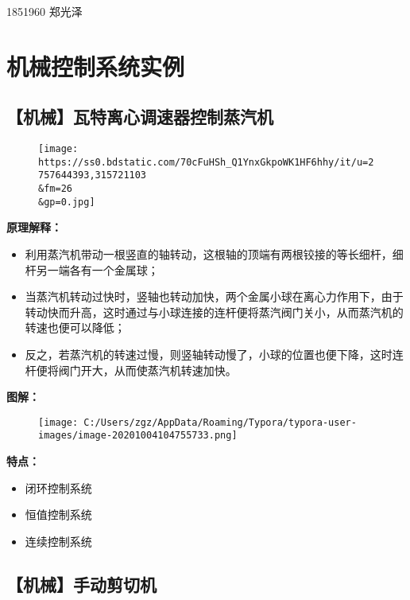 \documentclass[
]{article}
\author{}
\date{}
\begin{document}
1851960 郑光泽

\hypertarget{header-n2}{%
\section{机械控制系统实例}\label{header-n2}}

\hypertarget{header-n3}{%
\subsection{【机械】瓦特离心调速器控制蒸汽机}\label{header-n3}}

\begin{figure}
\centering
\texttt{[image: https://ss0.bdstatic.com/70cFuHSh\_Q1YnxGkpoWK1HF6hhy/it/u=2757644393,315721103\\\&fm=26\\\&gp=0.jpg]}
\caption{}
\end{figure}

\textbf{原理解释：}

\begin{itemize}
\item
  利用蒸汽机带动一根竖直的轴转动，这根轴的顶端有两根铰接的等长细杆，细杆另一端各有一个金属球；
\item
  当蒸汽机转动过快时，竖轴也转动加快，两个金属小球在离心力作用下，由于转动快而升高，这时通过与小球连接的连杆便将蒸汽阀门关小，从而蒸汽机的转速也便可以降低；
\item
  反之，若蒸汽机的转速过慢，则竖轴转动慢了，小球的位置也便下降，这时连杆便将阀门开大，从而使蒸汽机转速加快。
\end{itemize}

\textbf{图解：}

\begin{figure}
\centering
\texttt{[image: C:/Users/zgz/AppData/Roaming/Typora/typora-user-images/image-20201004104755733.png]}
\caption{}
\end{figure}

\textbf{特点：}

\begin{itemize}
\item
  闭环控制系统
\item
  恒值控制系统
\item
  连续控制系统
\end{itemize}

\hypertarget{header-n24}{%
\subsection{【机械】手动剪切机}\label{header-n24}}
\end{document}

